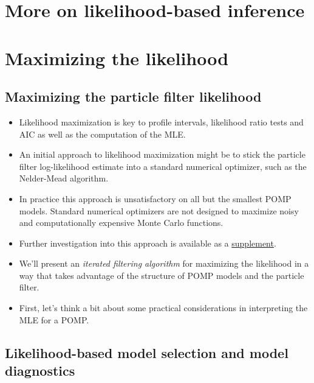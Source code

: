 \documentclass[
  letterpaper,
  DIV=11,
  numbers=noendperiod]{scrartcl}
\providecommand{\tightlist}{%
  \setlength{\itemsep}{0pt}\setlength{\parskip}{0pt}}\usepackage{longtable,booktabs,array}
\begin{document}
\hypertarget{more-on-likelihood-based-inference}{%
\section{More on likelihood-based
inference}\label{more-on-likelihood-based-inference}}

\hypertarget{maximizing-the-likelihood}{%
\section{Maximizing the likelihood}\label{maximizing-the-likelihood}}

\hypertarget{maximizing-the-particle-filter-likelihood}{%
\subsection{Maximizing the particle filter
likelihood}\label{maximizing-the-particle-filter-likelihood}}

\begin{itemize}
\tightlist
\item
  Likelihood maximization is key to profile intervals, likelihood ratio
  tests and AIC as well as the computation of the MLE.
\item
  An initial approach to likelihood maximization might be to stick the
  particle filter log-likelihood estimate into a standard numerical
  optimizer, such as the Nelder-Mead algorithm.
\item
  In practice this approach is unsatisfactory on all but the smallest
  POMP models. Standard numerical optimizers are not designed to
  maximize noisy and computationally expensive Monte Carlo functions.
\item
  Further investigation into this approach is available as a
  \href{pf-in-Nelder-Mead.html}{supplement}.
\item
  We'll present an \emph{iterated filtering algorithm} for maximizing
  the likelihood in a way that takes advantage of the structure of POMP
  models and the particle filter.
\item
  First, let's think a bit about some practical considerations in
  interpreting the MLE for a POMP.
\end{itemize}

\hypertarget{likelihood-based-model-selection-and-model-diagnostics}{%
\subsection{Likelihood-based model selection and model
diagnostics}\label{likelihood-based-model-selection-and-model-diagnostics}}
\end{document}
